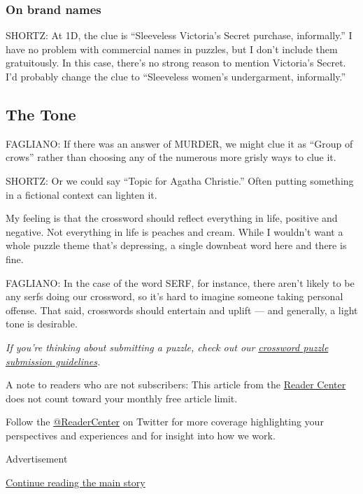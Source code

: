 \hypertarget{on-brand-names}{%
\subsubsection{On brand names}\label{on-brand-names}}

SHORTZ: At 1D, the clue is ``Sleeveless Victoria's Secret purchase,
informally.'' I have no problem with commercial names in puzzles, but I
don't include them gratuitously. In this case, there's no strong reason
to mention Victoria's Secret. I'd probably change the clue to
``Sleeveless women's undergarment, informally.''

\hypertarget{the-tone}{%
\subsection{The Tone}\label{the-tone}}

FAGLIANO: If there was an answer of MURDER, we might clue it as ``Group
of crows'' rather than choosing any of the numerous more grisly ways to
clue it.

SHORTZ: Or we could say ``Topic for Agatha Christie.'' Often putting
something in a fictional context can lighten it.

My feeling is that the crossword should reflect everything in life,
positive and negative. Not everything in life is peaches and cream.
While I wouldn't want a whole puzzle theme that's depressing, a single
downbeat word here and there is fine.

FAGLIANO: In the case of the word SERF, for instance, there aren't
likely to be any serfs doing our crossword, so it's hard to imagine
someone taking personal offense. That said, crosswords should entertain
and uplift --- and generally, a light tone is desirable.

\emph{If you're thinking about submitting a puzzle, check out our}
\href{https://www.nytimes3xbfgragh.onion/crosswords/submissions}{\emph{crossword
puzzle submission guidelines}}\emph{.}

A note to readers who are not subscribers: This article from the
\href{https://www.nytimes3xbfgragh.onion/section/reader-center}{Reader
Center} does not count toward your monthly free article limit.

Follow the \href{https://twitter.com/readercenter}{@ReaderCenter} on
Twitter for more coverage highlighting your perspectives and experiences
and for insight into how we work.

Advertisement

\protect\hyperlink{after-bottom}{Continue reading the main story}

